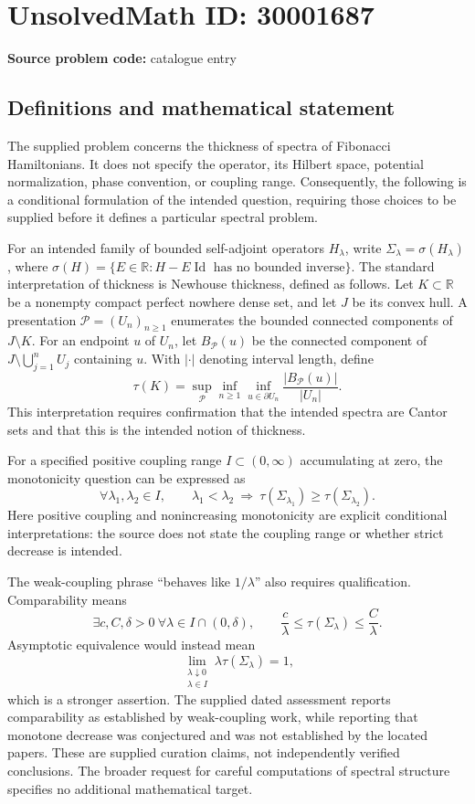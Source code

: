 \documentclass[11pt]{article}
\newcommand{\R}{\mathbb{R}}
\begin{document}
\section*{UnsolvedMath ID: 30001687}
\textbf{Source problem code:} catalogue entry
\subsection{Definitions and mathematical statement}
The supplied problem concerns the thickness of spectra of Fibonacci Hamiltonians. It does not specify the operator, its Hilbert space, potential normalization, phase convention, or coupling range. Consequently, the following is a conditional formulation of the intended question, requiring those choices to be supplied before it defines a particular spectral problem.

For an intended family of bounded self-adjoint operators \(H_\lambda\), write \(\Sigma_\lambda=\sigma(H_\lambda)\), where \(\sigma(H)=\{E\in\R:H-E\operatorname{Id}\text{ has no bounded inverse}\}\). The standard interpretation of thickness is Newhouse thickness, defined as follows. Let \(K\subset\R\) be a nonempty compact perfect nowhere dense set, and let \(J\) be its convex hull. A presentation \(\mathcal P=(U_n)_{n\geq1}\) enumerates the bounded connected components of \(J\setminus K\). For an endpoint \(u\) of \(U_n\), let \(B_{\mathcal P}(u)\) be the connected component of \(J\setminus\bigcup_{j=1}^{n}U_j\) containing \(u\). With \(|\cdot|\) denoting interval length, define
\[
\tau(K)=\sup_{\mathcal P}\inf_{n\geq1}\inf_{u\in\partial U_n}\frac{|B_{\mathcal P}(u)|}{|U_n|}.
\]
This interpretation requires confirmation that the intended spectra are Cantor sets and that this is the intended notion of thickness.

For a specified positive coupling range \(I\subset(0,\infty)\) accumulating at zero, the monotonicity question can be expressed as
\[
\forall\lambda_1,\lambda_2\in I,\qquad
\lambda_1<\lambda_2\ \Longrightarrow\ 
\tau(\Sigma_{\lambda_1})\geq\tau(\Sigma_{\lambda_2}).
\]
Here positive coupling and nonincreasing monotonicity are explicit conditional interpretations: the source does not state the coupling range or whether strict decrease is intended.

The weak-coupling phrase ``behaves like \(1/\lambda\)'' also requires qualification. Comparability means
\[
\exists c,C,\delta>0\ \forall\lambda\in I\cap(0,\delta),\qquad
\frac{c}{\lambda}\leq\tau(\Sigma_\lambda)\leq\frac{C}{\lambda}.
\]
Asymptotic equivalence would instead mean
\[
\lim_{\substack{\lambda\downarrow0\\\lambda\in I}}\lambda\tau(\Sigma_\lambda)=1,
\]
which is a stronger assertion. The supplied dated assessment reports comparability as established by weak-coupling work, while reporting that monotone decrease was conjectured and was not established by the located papers. These are supplied curation claims, not independently verified conclusions. The broader request for careful computations of spectral structure specifies no additional mathematical target.
\end{document}
